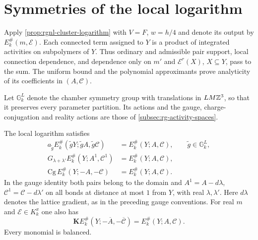 \section{Symmetries of the local logarithm}
\label{subsec:rgnl-symmetries}

Apply \cref{prop:rgnl-cluster-logarithm} with
$V=F$, $w=h/4$ and denote its output by
$E_k^\#(m,\mathscr E)$. Each connected term assigned to
$Y$ is a product of integrated activities on subpolymers
of $Y$. Thus ordinary and admissible pair support, local
connection dependence, and dependence only on $m'$ and
$\mathscr E^r(X)$, $X\subseteq Y$, pass to the sum.
The uniform bound and the polynomial approximants prove
analyticity of its coefficients in $(A,\mathscr C)$.

Let $\mathbb G_k^L$ denote the chamber symmetry group with
translations in $LM\mathbb Z^3$, so that it preserves every
parameter partition. Its actions and the gauge,
charge-conjugation and reality actions are those of
\cref{subsec:rg-activity-spaces}.

\begin{proposition}\label{prop:rgnl-symmetries}
The local logarithm satisfies
\begin{align}
 a_{\tilde g}E_k^\#(\tilde gY;\tilde gA,\tilde g\mathscr C)
          &=E_k^\#(Y;A,\mathscr C),\qquad \tilde g\in\mathbb G_k^L,
                                      \label{eq:rgnl-lattice-symmetry}\\
 G_{\lambda+\lambda'}E_k^\#(Y;A^1,\mathscr C^1)
          &=E_k^\#(Y;A,\mathscr C),    \label{eq:rgnl-gauge-symmetry}\\
 \mathrm{Cg}\,E_k^\#(Y;-A,-\mathscr C)
          &=E_k^\#(Y;A,\mathscr C).    \label{eq:rgnl-charge-symmetry}
\end{align}
In the gauge identity both pairs belong to the domain and
 $A^1=A-d\lambda$, $\mathscr C^1=\mathscr C-d\lambda'$
on all bonds at distance at most $1$ from $Y$, with
real $\lambda,\lambda'$. Here $d\lambda$ denotes the
lattice gradient, as in the preceding gauge conventions.
For real $m$ and $\mathscr E\in K_k^x$ one also has
\begin{equation}\label{eq:rgnl-reality-symmetry}
 \mathbf K E_k^\#(Y;-\overline A,-\overline{\mathscr C})
                                        =E_k^\#(Y;A,\mathscr C).
\end{equation}
Every monomial is balanced.
\end{proposition}

